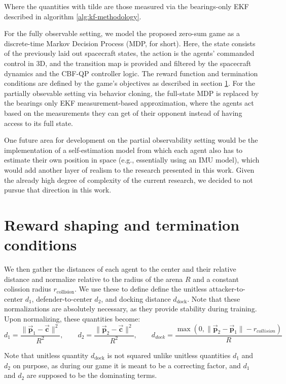 Where the quantities with tilde are those measured  via the bearings-only EKF described in algorithm \ref{alg:kf-methodology}. 

For the fully observable setting, we model the proposed zero-sum game as a discrete-time Markov Decision Process (MDP, for short). Here, the state consists of the previously laid out spacecraft states, the action is the agents' commanded control in 3D, and the transition map is provided and filtered by the spacecraft dynamics and the CBF-QP controller logic. The reward function and termination conditions are defined by the game's objectives as described in section \ref{sec:Rewards/Termination}. For the partially obsevable setting via behavior cloning, the full-state MDP is replaced by the bearings only EKF measurement-based approximation, where the agents act based on the measurements they can get of their opponent instead of having access to its full state.


One future area for development on the partial observability setting would be the implementation of a self-estimation model from which each agent also has to estimate their own position in space (e.g., essentially using an IMU model), which would add another layer of realism to the research presented in this work. Given the already high degree of complexity of the current research, we decided to not pursue that direction in this work.



\section{Reward shaping and termination conditions}
\label{sec:Rewards/Termination}

We then gather the distances of each agent to the center and their relative distance and normalize relative to the radius of the arena \(R\) and a constant colission radius $r_{\text{collision}}$. We use these to define define the unitless attacker-to-center $d_1$, defender-to-center $d_2$, and docking distance $d_{\text{dock}}$. Note that these normalizations are absolutely necessary, as they provide stability during training. Upon normalizing, these quantities become:
\[
d_1 = \frac{\|\vec{\mathbf{p}}_1-\vec{\mathbf{c}}\|^2}{R^2},\qquad
d_2 = \frac{\|\vec{\mathbf{p}}_2-\vec{\mathbf{c}}\|^2}{R^2},\qquad
d_{dock} = \frac{\max(0, \|\vec{\mathbf{p}}_2-\vec{\mathbf{p}}_1\| - r_{collision})}{R}
\]



Note that unitless quantity $d_{\text{dock}}$ is not squared unlike unitless quantities $d_1$ and $d_2$ on purpose, as during our game it is meant to be a correcting factor, and $d_1$ and $d_2$ are supposed to be the dominating terms. 

